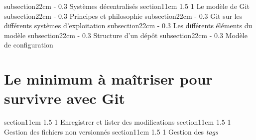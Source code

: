 \documentclass[a4paper,twoside,french]{book}
\makeatletter
\renewcommand\section{\@startsection
  {section}{1}{1cm}%
  {1.5\baselineskip}%
  {1\baselineskip}%
  {\normalfont\Large\bfseries}}%
\renewcommand\subsection{\@startsection
  {subsection}{2}{2cm}%
  {-\baselineskip}%
  {0.3\baselineskip}%
  {\normalfont\normalsize\itshape\bfseries}}%
\makeatother
\begin{document}
\subsection{Systèmes décentralisés} %
\section{Le modèle de Git} %
\subsection{Principes et philosophie} %
\subsection{Git sur les différents systèmes d'exploitation} %
\subsection{Les différents éléments du modèle} %
\subsection{Structure d'un dépôt} %
\subsection{Modèle de configuration} %

\chapter{Le minimum à maîtriser pour survivre avec Git} %
\section{Enregistrer et lister des modifications} %
\section{Gestion des fichiers non versionnés} %
\section{Gestion des \textit{tags}}
\end{document}
